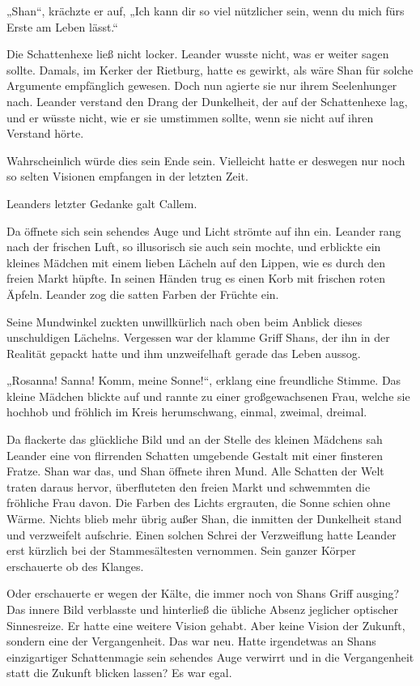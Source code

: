 „Shan“, krächzte er auf, „Ich kann dir so viel nützlicher sein, wenn du mich fürs Erste am Leben lässt.“

Die Schattenhexe ließ nicht locker. Leander wusste nicht, was er weiter sagen sollte. Damals, im Kerker der Rietburg, hatte es gewirkt, als wäre Shan für solche Argumente empfänglich gewesen. Doch nun agierte sie nur ihrem Seelenhunger nach. Leander verstand den Drang der Dunkelheit, der auf der Schattenhexe lag, und er wüsste nicht, wie er sie umstimmen sollte, wenn sie nicht auf ihren Verstand hörte.

Wahrscheinlich würde dies sein Ende sein. Vielleicht hatte er deswegen nur noch so selten Visionen empfangen in der letzten Zeit.

Leanders letzter Gedanke galt Callem.

Da öffnete sich sein sehendes Auge und Licht strömte auf ihn ein. Leander rang nach der frischen Luft, so illusorisch sie auch sein mochte, und erblickte ein kleines Mädchen mit einem lieben Lächeln auf den Lippen, wie es durch den freien Markt hüpfte. In seinen Händen trug es einen Korb mit frischen roten Äpfeln. Leander zog die satten Farben der Früchte ein.

Seine Mundwinkel zuckten unwillkürlich nach oben beim Anblick dieses unschuldigen Lächelns. Vergessen war der klamme Griff Shans, der ihn in der Realität gepackt hatte und ihm unzweifelhaft gerade das Leben aussog.

„Rosanna! Sanna! Komm, meine Sonne!“, erklang eine freundliche Stimme. Das kleine Mädchen blickte auf und rannte zu einer großgewachsenen Frau, welche sie hochhob und fröhlich im Kreis herumschwang, einmal, zweimal, dreimal.

Da flackerte das glückliche Bild und an der Stelle des kleinen Mädchens sah Leander eine von flirrenden Schatten umgebende Gestalt mit einer finsteren Fratze. Shan war das, und Shan öffnete ihren Mund. Alle Schatten der Welt traten daraus hervor, überfluteten den freien Markt und schwemmten die fröhliche Frau davon. Die Farben des Lichts ergrauten, die Sonne schien ohne Wärme. Nichts blieb mehr übrig außer Shan, die inmitten der Dunkelheit stand und verzweifelt aufschrie. Einen solchen Schrei der Verzweiflung hatte Leander erst kürzlich bei der Stammesältesten vernommen. Sein ganzer Körper erschauerte ob des Klanges.

Oder erschauerte er wegen der Kälte, die immer noch von Shans Griff ausging? Das innere Bild verblasste und hinterließ die übliche Absenz jeglicher optischer Sinnesreize. Er hatte eine weitere Vision gehabt. Aber keine Vision der Zukunft, sondern eine der Vergangenheit. Das war neu. Hatte irgendetwas an Shans einzigartiger Schattenmagie sein sehendes Auge verwirrt und in die Vergangenheit statt die Zukunft blicken lassen? Es war egal.

